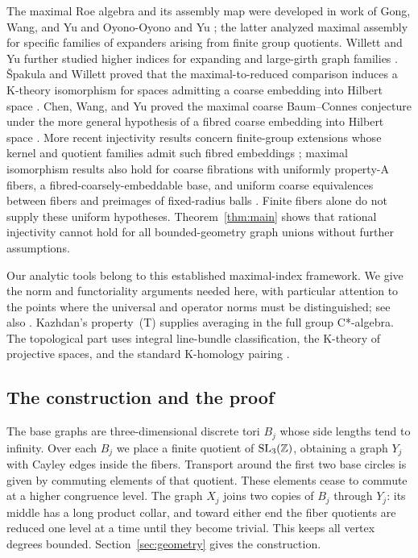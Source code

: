 The maximal Roe algebra and its assembly map were developed in work of
Gong, Wang, and Yu \cite{GWY08} and Oyono-Oyono and Yu \cite{OOY09}; the
latter analyzed maximal assembly for specific families of expanders arising
from finite group quotients. Willett and Yu further studied higher indices
for expanding and large-girth graph families \cite{WY12}.
\v{S}pakula and Willett proved that the maximal-to-reduced comparison
induces a K-theory isomorphism for spaces admitting a coarse embedding into
Hilbert space \cite{SW13}. Chen, Wang, and Yu proved the maximal coarse
Baum--Connes conjecture under the more general hypothesis of a fibred
coarse embedding into Hilbert space \cite{CWY13}. More recent injectivity
results concern finite-group extensions whose kernel and quotient families
admit such fibred embeddings \cite{DGWY25}; maximal isomorphism results also
hold for coarse fibrations with uniformly property-A fibers, a
fibred-coarsely-embeddable base, and uniform coarse equivalences between
fibers and preimages of fixed-radius balls \cite{GWZ25}. Finite fibers alone do not
supply these uniform hypotheses. Theorem~\ref{thm:main}
shows that rational injectivity cannot hold for all bounded-geometry graph
unions without further assumptions.

Our analytic tools belong to this established maximal-index framework.
We give the norm and functoriality arguments needed here, with particular
attention to the points where the universal and operator norms must be
distinguished; see also \cite{OOY09,SW13,SS21}. Kazhdan's property~(T)
\cite{Kazhdan67,BHV08} supplies averaging in the full group C*-algebra.
The topological part uses integral line-bundle classification, the
K-theory of projective spaces, and the standard K-homology pairing
\cite{Atiyah67,Blackadar98,HigsonRoe00}.

\subsection{The construction and the proof}

The base graphs are three-dimensional discrete tori $B_j$ whose side
lengths tend to infinity. Over each $B_j$ we place a finite quotient of
$\operatorname{SL}_3(\mathbb Z)$, obtaining a graph $Y_j$ with Cayley edges inside the fibers.
Transport around the first two base circles is given by commuting elements
of that quotient. These elements cease to commute at a higher congruence
level. The graph $X_j$ joins two copies of $B_j$ through $Y_j$: its middle
has a long product collar, and toward either end the fiber quotients are
reduced one level at a time until they become trivial. This keeps all
vertex degrees bounded. Section~\ref{sec:geometry} gives the construction.

